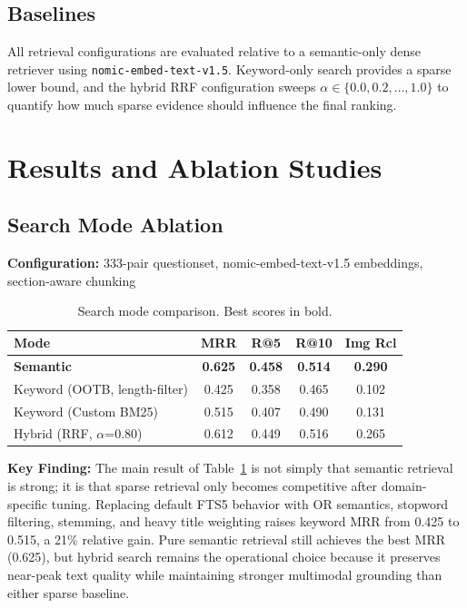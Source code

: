 \documentclass[11pt,a4paper]{article}
\begin{document}
\subsection{Baselines}

All retrieval configurations are evaluated relative to a semantic-only dense retriever using \texttt{nomic-embed-text-v1.5}. Keyword-only search provides a sparse lower bound, and the hybrid RRF configuration sweeps $\alpha \in \{0.0, 0.2, \ldots, 1.0\}$ to quantify how much sparse evidence should influence the final ranking.



\section{Results and Ablation Studies}

\subsection{Search Mode Ablation}

\textbf{Configuration:} 333-pair questionset, nomic-embed-text-v1.5 embeddings, section-aware chunking

\begin{table}[h]
\caption{Search mode comparison. Best scores in bold.}
\label{tab:search-mode}
\centering
\begin{tabular}{lcccc}
\toprule
\textbf{Mode} & \textbf{MRR} & \textbf{R@5} & \textbf{R@10} & \textbf{Img Rcl} \\
\midrule
\textbf{Semantic} & \textbf{0.625} & \textbf{0.458} & \textbf{0.514} & \textbf{0.290} \\
Keyword (OOTB, length-filter) & 0.425 & 0.358 & 0.465 & 0.102 \\
Keyword (Custom BM25) & 0.515 & 0.407 & 0.490 & 0.131 \\
Hybrid (RRF, $\alpha$=0.80) & 0.612 & 0.449 & 0.516 & 0.265 \\
\bottomrule
\end{tabular}

\end{table}

\textbf{Key Finding:} The main result of Table~\ref{tab:search-mode} is not simply that semantic retrieval is strong; it is that sparse retrieval only becomes competitive after domain-specific tuning. Replacing default FTS5 behavior with OR semantics, stopword filtering, stemming, and heavy title weighting raises keyword MRR from 0.425 to 0.515, a 21\% relative gain. Pure semantic retrieval still achieves the best MRR (0.625), but hybrid search remains the operational choice because it preserves near-peak text quality while maintaining stronger multimodal grounding than either sparse baseline.
\end{document}

